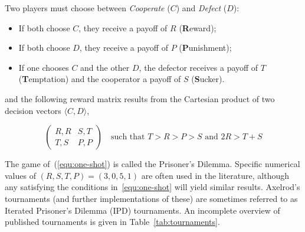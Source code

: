 \documentclass{jors}
\begin{document}
Two players must choose between \textit{Cooperate} (\(C\)) and \textit{Defect}
(\(D\)):

\begin{itemize}[noitemsep,topsep=0pt]
    \item If both choose \(C\), they receive a payoff of \(R\)
        (\textbf{R}eward);
    \item If both choose \(D\), they receive a payoff of \(P\)
        (\textbf{P}unishment);
    \item If one chooses \(C\) and the other \(D\), the defector receives a
        payoff of \(T\) (\textbf{T}emptation) and the cooperator a payoff of
        \(S\) (\textbf{S}ucker).
\end{itemize}

and the following reward matrix results from the Cartesian product of
two decision vectors $\langle C, D \rangle$,

\begin{equation}
    \begin{pmatrix}
        R,R & S,T\\
        T,S & P,P
    \end{pmatrix}\quad\text{such that } T>R>P>S \text{ and } 2R > T + S
    \label{equ:one-shot}
\end{equation}

The game of~(\ref{equ:one-shot}) is called the Prisoner's Dilemma. Specific
numerical values of \((R,S,T,P)=(3,0,5,1)\) are often used in the literature,
although any satisfying the conditions in~\ref{equ:one-shot} will yield similar
results.  Axelrod's tournaments (and further implementations of these) are
sometimes referred to as Iterated Prisoner's Dilemma (IPD) tournaments. An
incomplete overview of published tournaments is given in
Table~\ref{tab:tournaments}.
\end{document}
